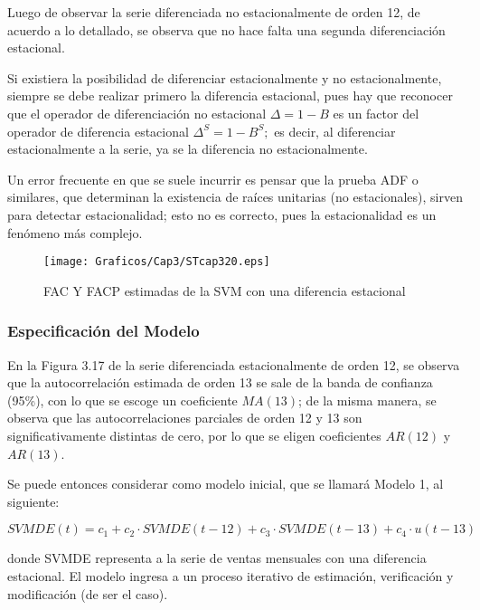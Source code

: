 Luego de observar la serie diferenciada no estacionalmente de orden 12, de acuerdo a lo detallado, se observa que no hace falta una segunda diferenciaci\'{o}n estacional.

\begin{observacion}
Si existiera la posibilidad de diferenciar estacionalmente y no estacionalmente, siempre se debe realizar primero la diferencia estacional, pues hay que reconocer que el operador de diferenciaci\'{o}n no estacional ${\Delta }=1-B$ es un factor del operador de diferencia estacional ${\Delta }^{S}=1-B^{S};$ es decir, al diferenciar estacionalmente a la serie, ya se la diferencia no estacionalmente.
\end{observacion}


\begin{observacion}
Un error frecuente en que se suele incurrir es pensar que la prueba ADF o similares, que determinan la existencia de ra\'{i}ces unitarias (no estacionales), sirven para detectar estacionalidad; esto no es correcto, pues la estacionalidad es un fen\'{o}meno m\'{a}s complejo.
\end{observacion}

\begin{figure}[H]
\centering
\texttt{[image: Graficos/Cap3/STcap320.eps]}
\caption{FAC Y FACP estimadas de la SVM con una diferencia estacional}
\end{figure}


\subsubsection*{Especificaci\'{o}n del Modelo}

En la Figura 3.17 de la serie diferenciada estacionalmente de orden 12, se observa que la autocorrelaci\'{o}n estimada de orden 13 se sale de la banda de confianza (95{\%}), con lo que se escoge un coeficiente $MA(13)$; de la misma manera, se observa que las autocorrelaciones parciales de orden 12 y 13 son significativamente distintas de cero, por lo que se eligen coeficientes $AR(12)$ y $AR(13)$.\newline

Se puede entonces considerar como modelo inicial, que se llamar\'{a} Modelo 1, al siguiente:

\[
SVMDE\left( t \right)=c_{1}+c_{2}\cdot SVMDE\left( t-12 \right)+c_{3}\cdot 
SVMDE\left( t-13 \right)+c_{4}\cdot u(t-13)
\]

donde SVMDE representa a la serie de ventas mensuales con una diferencia estacional. El modelo ingresa a un proceso iterativo de estimaci\'{o}n, verificaci\'{o}n y modificaci\'{o}n (de ser el caso).

